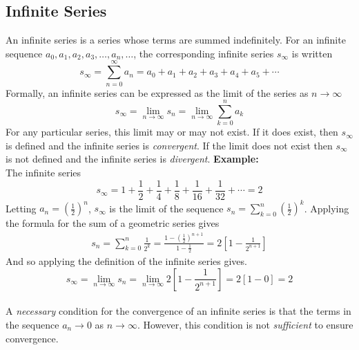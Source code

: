 \documentclass[]{report}
\begin{document}
\pagebreak
\subsection*{Infinite Series}
An infinite series is a series whose terms are summed indefinitely. For an infinite sequence $a_0,a_1,a_2,a_3,\ldots,a_n,\ldots$, the corresponding infinite series $s_\infty$ is written
\begin{equation*}
  s_\infty=\sum_{n=0}^{\infty}a_n=a_0+a_1+a_2+a_3+a_4+a_5+\cdots
\end{equation*}
Formally, an infinite series can be expressed as the limit of the series as $n\to \infty$
\begin{equation*}
  s_\infty = \lim_{n \to \infty} s_n = \lim_{n \to \infty} \sum_{k=0}^n a_k 
\end{equation*}
For any particular series, this limit may or may not exist. If it does exist, then $s_\infty$ is defined and the infinite series is \emph{convergent}. If the limit does not exist then $s_\infty$ is not defined and the infinite series is \emph{divergent}.
\medskip
\noindent  \textbf{Example:}\\
The infinite series
\begin{equation*}
  s_\infty = 1+\frac{1}{2}+\frac{1}{4}+\frac{1}{8}+\frac{1}{16}+\frac{1}{32}+\cdots = 2
\end{equation*}
Letting $a_n=\left(\frac{1}{2}\right)^n$, $s_\infty$ is the limit of the sequence $s_n=\sum_{k=0}^{n} \left(\frac{1}{2}\right)^k$. Applying the formula for the sum of a geometric series gives 
\begin{align*}
  s_n = \sum_{k=0}^{n} \frac{1}{2^k} = \frac{1- \left( \frac{1}{2} \right)^{n+1} }{1-\frac{1}{2}} = 2 \left[ 1-\frac{1}{2^{n+1}} \right]
\end{align*}
And so applying the definition of the infinite series gives.
\begin{equation*}
  s_\infty=\lim_{n \to \infty} s_n = \lim_{n \to \infty} 2 \left[ 1- \frac{1}{2^{n+1}} \right]= 2 \left[ 1-0 \right] = 2
\end{equation*}\\
A \emph{necessary} condition for the convergence of an infinite series is that the terms in the sequence $a_n \to 0$ as $n \to \infty$. However, this condition is not \emph{sufficient} to ensure convergence.
\end{document}
